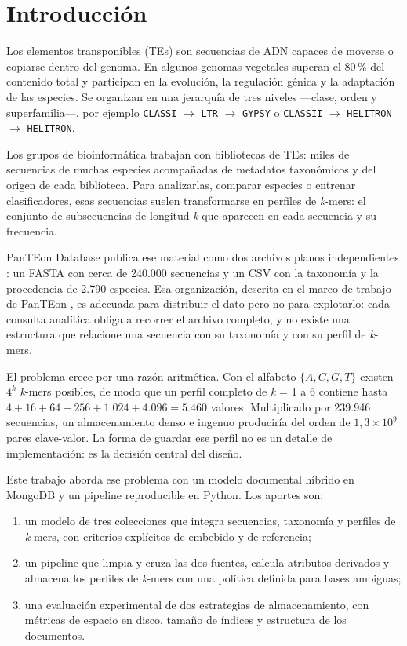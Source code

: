 \documentclass[journal]{IEEEtran}
\begin{document}
\section{Introducción}
Los elementos transponibles (TEs) son secuencias de ADN capaces de moverse o copiarse
dentro del genoma. En algunos genomas vegetales superan el 80\,\% del contenido total y
participan en la evolución, la regulación génica y la adaptación de las especies. Se
organizan en una jerarquía de tres niveles ---clase, orden y superfamilia---, por ejemplo
\texttt{CLASSI} $\rightarrow$ \texttt{LTR} $\rightarrow$ \texttt{GYPSY} o
\texttt{CLASSII} $\rightarrow$ \texttt{HELITRON} $\rightarrow$ \texttt{HELITRON}.

Los grupos de bioinformática trabajan con bibliotecas de TEs: miles de secuencias de
muchas especies acompañadas de metadatos taxonómicos y del origen de cada biblioteca.
Para analizarlas, comparar especies o entrenar clasificadores, esas secuencias suelen
transformarse en perfiles de \textit{k}-mers: el conjunto de subsecuencias de longitud
\textit{k} que aparecen en cada secuencia y su frecuencia.

PanTEon Database publica ese material como dos archivos planos independientes
\cite{panteon2026zenodo}: un FASTA con cerca de 240.000 secuencias y un CSV con la
taxonomía y la procedencia de 2.790 especies. Esa organización, descrita en el marco de
trabajo de PanTEon \cite{orozco2026panteon}, es adecuada para distribuir el dato pero no
para explotarlo: cada consulta analítica obliga a recorrer el archivo completo, y no
existe una estructura que relacione una secuencia con su taxonomía y con su perfil de
\textit{k}-mers.

El problema crece por una razón aritmética. Con el alfabeto $\{A, C, G, T\}$ existen
$4^{k}$ \textit{k}-mers posibles, de modo que un perfil completo de \textit{k} = 1 a 6
contiene hasta $4 + 16 + 64 + 256 + 1.024 + 4.096 = 5.460$ valores. Multiplicado por
239.946 secuencias, un almacenamiento denso e ingenuo produciría del orden de
$1{,}3 \times 10^{9}$ pares clave-valor. La forma de guardar ese perfil no es un detalle
de implementación: es la decisión central del diseño.

Este trabajo aborda ese problema con un modelo documental híbrido en MongoDB y un
pipeline reproducible en Python. Los aportes son:
\begin{enumerate}
  \item un modelo de tres colecciones que integra secuencias, taxonomía y perfiles de
        \textit{k}-mers, con criterios explícitos de embebido y de referencia;
  \item un pipeline que limpia y cruza las dos fuentes, calcula atributos derivados y
        almacena los perfiles de \textit{k}-mers con una política definida para bases
        ambiguas;
  \item una evaluación experimental de dos estrategias de almacenamiento, con métricas de
        espacio en disco, tamaño de índices y estructura de los documentos.
\end{enumerate}
\end{document}
